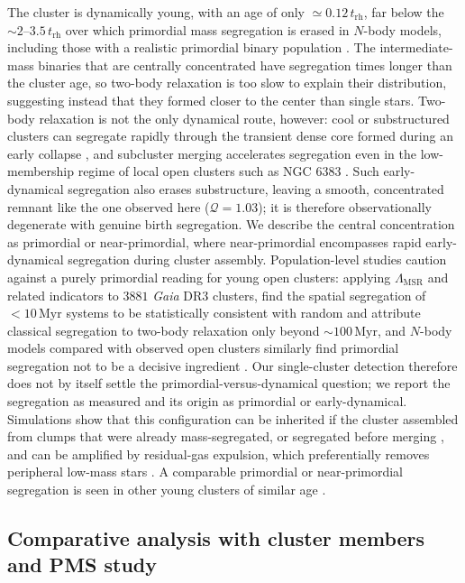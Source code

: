 \documentclass{aa}
\begin{document}
The cluster is dynamically young, with an age of only $\simeq0.12\,t_{\mathrm{rh}}$, far below the $\sim2$--$3.5\,t_{\mathrm{rh}}$ over which primordial mass segregation is erased in $N$-body models, including those with a realistic primordial binary population \citep{2020A&A...638A.155P}. The intermediate-mass binaries that are centrally concentrated have segregation times longer than the cluster age, so two-body relaxation is too slow to explain their distribution, suggesting instead that they formed closer to the center than single stars. Two-body relaxation is not the only dynamical route, however: cool or substructured clusters can segregate rapidly through the transient dense core formed during an early collapse \citep{2009ApJ...700L..99A}, and subcluster merging accelerates segregation even in the low-membership regime of local open clusters such as NGC 6383 \citep{2009MNRAS.400..657M}. Such early-dynamical segregation also erases substructure, leaving a smooth, concentrated remnant like the one observed here ($\mathcal{Q}=1.03$); it is therefore observationally degenerate with genuine birth segregation. We describe the central concentration as primordial or near-primordial, where near-primordial encompasses rapid early-dynamical segregation during cluster assembly. Population-level studies caution against a purely primordial reading for young open clusters: applying $\Lambda_{\mathrm{MSR}}$ and related indicators to $3881$ \textit{Gaia} DR3 clusters, \citet{2026AJ....171..236Z} find the spatial segregation of $<10\,\mathrm{Myr}$ systems to be statistically consistent with random and attribute classical segregation to two-body relaxation only beyond $\sim100\,\mathrm{Myr}$, and $N$-body models compared with observed open clusters similarly find primordial segregation not to be a decisive ingredient \citep{2026arXiv260604509A}. Our single-cluster detection therefore does not by itself settle the primordial-versus-dynamical question; we report the segregation as measured and its origin as primordial or early-dynamical. Simulations show that this configuration can be inherited if the cluster assembled from clumps that were already mass-segregated, or segregated before merging \citep{2007ApJ...655L..45M}, and can be amplified by residual-gas expulsion, which preferentially removes peripheral low-mass stars \citep{2007MNRAS.380.1589B}. A comparable primordial or near-primordial segregation is seen in other young clusters of similar age \citep{2007AJ....134.1368C,2008AJ....135..173S}.

\subsection{Comparative analysis with cluster members and PMS study}
\end{document}
